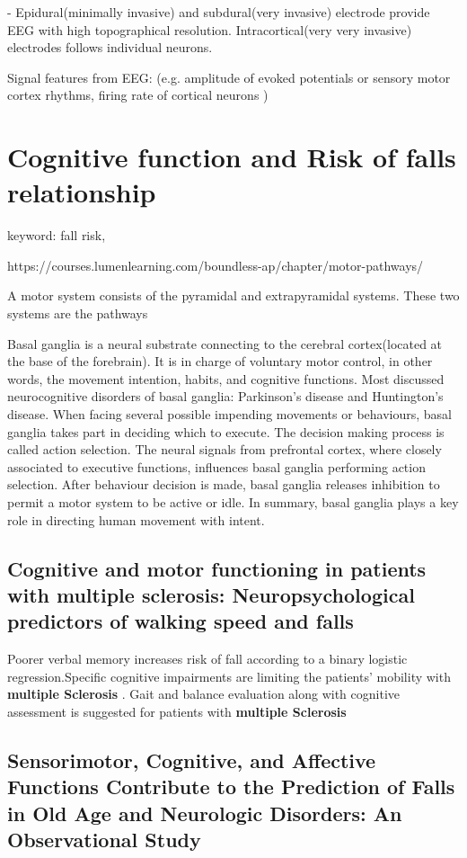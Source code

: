 \documentclass{article}
\begin{document}
- Epidural(minimally invasive) and subdural(very invasive) electrode provide EEG with high topographical resolution. Intracortical(very very invasive) electrodes follows individual neurons.

Signal features from EEG: (e.g. amplitude of evoked potentials or sensory motor cortex rhythms, firing rate of cortical neurons \cite{WOLPAW_2002})


\section{Cognitive function and Risk of falls relationship}
keyword: fall risk,

https://courses.lumenlearning.com/boundless-ap/chapter/motor-pathways/

A motor system consists of the pyramidal and extrapyramidal systems. These two systems are the pathways 

Basal ganglia is a neural substrate connecting to the cerebral cortex(located at the base of the forebrain). It is in charge of voluntary motor control, in other words, the movement intention, habits, and cognitive functions. Most discussed neurocognitive disorders of basal ganglia: Parkinson's disease and Huntington's disease. When facing several possible impending movements or behaviours, basal ganglia takes part in deciding which to execute. The decision making process is called action selection. The neural signals from prefrontal cortex, where closely associated to executive functions, influences basal ganglia performing action selection. After behaviour decision is made, basal ganglia releases inhibition to permit a motor system to be active or idle. In summary, basal ganglia plays a key role in directing human movement with intent.

\subsection{Cognitive and motor functioning in patients with multiple sclerosis: Neuropsychological predictors of walking speed and falls}
Poorer verbal memory increases risk of fall according to a binary logistic regression.Specific cognitive impairments are limiting the patients' mobility with \textbf{multiple Sclerosis} . Gait and balance evaluation along with cognitive assessment is suggested for patients with \textbf{multiple Sclerosis} \cite{D_Orio_2012}
\subsection{Sensorimotor, Cognitive, and Affective Functions Contribute to the Prediction of Falls in Old Age and Neurologic Disorders: An Observational Study}
\end{document}
